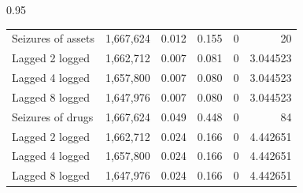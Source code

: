 \documentclass[12pt,letterpaper]{article}
\begin{document}
\begin{table}[h!]
\begin{spacing}{0.95}
\begin{tabular}{lrrrrr}
												
	Seizures of assets	&	 1,667,624 	&	0.012	&	0.155	&	0	&	20	 \\
	\hspace{1em} Lagged 2 logged	&	 1,662,712 	&	0.007	&	0.081	&	0	&	3.044523	 \\
	\hspace{1em} Lagged 4 logged	&	 1,657,800 	&	0.007	&	0.080	&	0	&	3.044523	 \\
	\hspace{1em} Lagged 8 logged	&	 1,647,976 	&	0.007	&	0.080	&	0	&	3.044523	 \\
												
												
	Seizures of drugs	&	 1,667,624 	&	0.049	&	0.448	&	0	&	84	 \\
	\hspace{1em} Lagged 2 logged	&	 1,662,712 	&	0.024	&	0.166	&	0	&	4.442651	 \\
	\hspace{1em} Lagged 4 logged	&	 1,657,800 	&	0.024	&	0.166	&	0	&	4.442651	 \\
	\hspace{1em} Lagged 8 logged	&	 1,647,976 	&	0.024	&	0.166	&	0	&	4.442651	 \\
												

\end{tabular}
\end{spacing}
\end{table}
\end{document}
